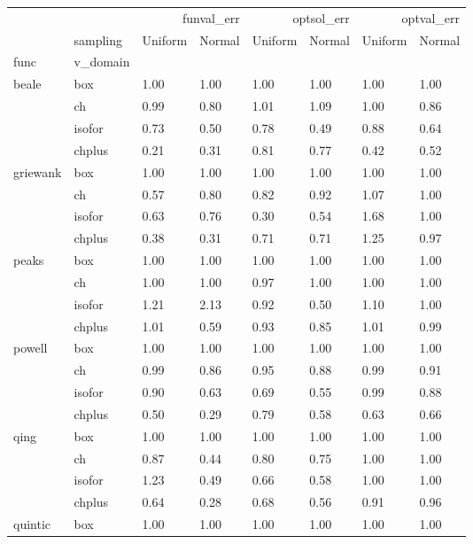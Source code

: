 \begin{table}
\label{tab:mean}
\begin{tabular}{llllllll}
\toprule
 &  & \multicolumn{2}{r}{funval_err} & \multicolumn{2}{r}{optsol_err} & \multicolumn{2}{r}{optval_err} \\
 & sampling & Uniform & Normal & Uniform & Normal & Uniform & Normal \\
func & v_domain &  &  &  &  &  &  \\
\midrule
\multirow[t]{4}{*}{beale} & box & 1.00 & 1.00 & 1.00 & 1.00 & 1.00 & 1.00 \\
 & ch & 0.99 & 0.80 & 1.01 & 1.09 & 1.00 & 0.86 \\
 & isofor & 0.73 & 0.50 & 0.78 & 0.49 & 0.88 & 0.64 \\
 & chplus & 0.21 & 0.31 & 0.81 & 0.77 & 0.42 & 0.52 \\
\cline{1-8}
\multirow[t]{4}{*}{griewank} & box & 1.00 & 1.00 & 1.00 & 1.00 & 1.00 & 1.00 \\
 & ch & 0.57 & 0.80 & 0.82 & 0.92 & 1.07 & 1.00 \\
 & isofor & 0.63 & 0.76 & 0.30 & 0.54 & 1.68 & 1.00 \\
 & chplus & 0.38 & 0.31 & 0.71 & 0.71 & 1.25 & 0.97 \\
\cline{1-8}
\multirow[t]{4}{*}{peaks} & box & 1.00 & 1.00 & 1.00 & 1.00 & 1.00 & 1.00 \\
 & ch & 1.00 & 1.00 & 0.97 & 1.00 & 1.00 & 1.00 \\
 & isofor & 1.21 & 2.13 & 0.92 & 0.50 & 1.10 & 1.00 \\
 & chplus & 1.01 & 0.59 & 0.93 & 0.85 & 1.01 & 0.99 \\
\cline{1-8}
\multirow[t]{4}{*}{powell} & box & 1.00 & 1.00 & 1.00 & 1.00 & 1.00 & 1.00 \\
 & ch & 0.99 & 0.86 & 0.95 & 0.88 & 0.99 & 0.91 \\
 & isofor & 0.90 & 0.63 & 0.69 & 0.55 & 0.99 & 0.88 \\
 & chplus & 0.50 & 0.29 & 0.79 & 0.58 & 0.63 & 0.66 \\
\cline{1-8}
\multirow[t]{4}{*}{qing} & box & 1.00 & 1.00 & 1.00 & 1.00 & 1.00 & 1.00 \\
 & ch & 0.87 & 0.44 & 0.80 & 0.75 & 1.00 & 1.00 \\
 & isofor & 1.23 & 0.49 & 0.66 & 0.58 & 1.00 & 1.00 \\
 & chplus & 0.64 & 0.28 & 0.68 & 0.56 & 0.91 & 0.96 \\
\cline{1-8}
\multirow[t]{4}{*}{quintic} & box & 1.00 & 1.00 & 1.00 & 1.00 & 1.00 & 1.00 \\

\end{tabular}
\end{table}
